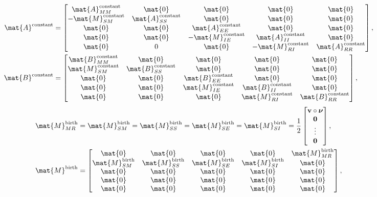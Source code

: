\documentclass{jpmarticle}
\renewcommand{\vec}[1]{\boldsymbol{\mathrm{#1}}}
\begin{document}
\begin{equation}
  \begin{split}
    \mat{A}^{\text{constant}} &=
    \begin{bmatrix}
      \mat{A}_{MM}^{\text{constant}} & \mat{0} & \mat{0} & \mat{0} & \mat{0}
      \\
      - \mat{M}_{SM}^{\text{constant}} & \mat{A}_{SS}^{\text{constant}} &
      \mat{0} & \mat{0} & \mat{0}
      \\
      \mat{0} & \mat{0} & \mat{A}_{EE}^{\text{constant}} & \mat{0} & \mat{0}
      \\
      \mat{0} & \mat{0} & - \mat{M}_{IE}^{\text{constant}} &
      \mat{A}_{II}^{\text{constant}} & \mat{0}
      \\
      \mat{0} & 0 & \mat{0} & - \mat{M}_{RI}^{\text{constant}} &
      \mat{A}_{RR}^{\text{constant}}
    \end{bmatrix},
    \\
    \mat{B}^{\text{constant}} &=
    \begin{bmatrix}
      \mat{B}_{MM}^{\text{constant}} & \mat{0} & \mat{0} & \mat{0} & \mat{0}
      \\
      \mat{M}_{SM}^{\text{constant}} & \mat{B}_{SS}^{\text{constant}} &
      \mat{0} & \mat{0} & \mat{0}
      \\
      \mat{0} & \mat{0} & \mat{B}_{EE}^{\text{constant}} & \mat{0} & \mat{0}
      \\
      \mat{0} & \mat{0} & \mat{M}_{IE}^{\text{constant}} &
      \mat{B}_{II}^{\text{constant}} & \mat{0}
      \\
      \mat{0} & \mat{0} & \mat{0} & \mat{M}_{RI}^{\text{constant}} &
      \mat{B}_{RR}^{\text{constant}}
    \end{bmatrix},
  \end{split}
\end{equation}
\begin{equation}
  \begin{split}
    \mat{M}_{MR}^{\text{birth}} &=
    \mat{M}_{SM}^{\text{birth}} =
    \mat{M}_{SS}^{\text{birth}} =
    \mat{M}_{SE}^{\text{birth}} =
    \mat{M}_{SI}^{\text{birth}} =
    \frac{1}{2}
    \begin{bmatrix}
      \vec{v} \circ \vec{\nu} \\ \vec{0} \\ \vdots \\ \vec{0}
    \end{bmatrix},
    \\
    \mat{M}^{\text{birth}} &=
    \begin{bmatrix}
      \mat{0} & \mat{0} & \mat{0} & \mat{0} & \mat{M}_{MR}^{\text{birth}}
      \\
      \mat{M}_{SM}^{\text{birth}} & \mat{M}_{SS}^{\text{birth}} &
      \mat{M}_{SE}^{\text{birth}} & \mat{M}_{SI}^{\text{birth}} & \mat{0}
      \\
      \mat{0} & \mat{0} & \mat{0} & \mat{0} & \mat{0}
      \\
      \mat{0} & \mat{0} & \mat{0} & \mat{0} & \mat{0}
      \\
      \mat{0} & \mat{0} & \mat{0} & \mat{0} & \mat{0}
    \end{bmatrix},
  \end{split}
\end{equation}
\end{document}
